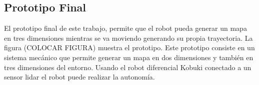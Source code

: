 \subsection{Prototipo Final}
El prototipo final de este trabajo, permite que el robot pueda generar un mapa en tres dimensiones 
mientras se va moviendo generando su propia trayectoria. La figura (COLOCAR FIGURA) muestra el 
prototipo. Este prototipo consiste en un sistema mecánico que permite generar un mapa en dos 
dimensiones y también en tres dimensiones del entorno. Usando el robot diferencial Kobuki 
conectado a un sensor lidar el robot puede realizar la autonomía.




